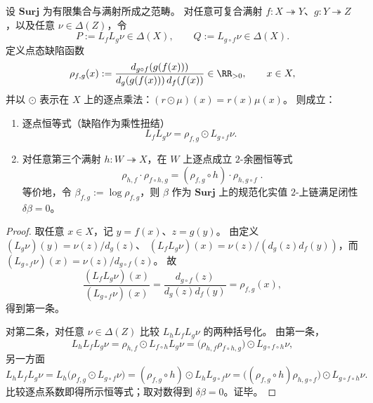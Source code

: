 \begin{theorem}\label{thm:pom-bc-defect-multiplicative-2cocycle}
设 \(\mathbf{Surj}\) 为有限集合与满射所成之范畴。
对任意可复合满射 \(f:X\twoheadrightarrow Y\)、\(g:Y\twoheadrightarrow Z\)，以及任意 \(\nu\in\Delta(Z)\)，令
\[
P:=L_fL_g\nu\in\Delta(X),\qquad Q:=L_{g\circ f}\nu\in\Delta(X).
\]
定义点态缺陷函数
\[
\rho_{f,g}(x):=\frac{d_{g\circ f}(g(f(x)))}{d_g(g(f(x)))\,d_f(f(x))}\in\RR_{>0},\qquad x\in X,
\]
并以 \(\odot\) 表示在 \(X\) 上的逐点乘法：\((r\odot\mu)(x)=r(x)\mu(x)\)。
则成立：
\begin{enumerate}
  \item 逐点恒等式（缺陷作为乘性扭结）
  \[
  \boxed{\;L_fL_g\nu=\rho_{f,g}\odot L_{g\circ f}\nu.\;}
  \]
  \item 对任意第三个满射 \(h:W\twoheadrightarrow X\)，在 \(W\) 上逐点成立 \(2\)-余圈恒等式
  \[
  \boxed{\;
  \rho_{h,f}\cdot \rho_{f\circ h,g}
  =(\rho_{f,g}\circ h)\cdot \rho_{h,g\circ f}\; }.
  \]
  等价地，令 \(\beta_{f,g}:=\log\rho_{f,g}\)，则 \(\beta\) 作为 \(\mathbf{Surj}\) 上的规范化实值 \(2\)-上链满足闭性 \(\delta\beta=0\)。
\end{enumerate}
\end{theorem}
\begin{proof}
取任意 \(x\in X\)，记 \(y=f(x)\)、\(z=g(y)\)。
由定义
\(
(L_g\nu)(y)=\nu(z)/d_g(z)
\)、
\(
(L_fL_g\nu)(x)=\nu(z)/(d_g(z)d_f(y))
\)，而
\(
(L_{g\circ f}\nu)(x)=\nu(z)/d_{g\circ f}(z)
\)。
故
\[
\frac{(L_fL_g\nu)(x)}{(L_{g\circ f}\nu)(x)}
=\frac{d_{g\circ f}(z)}{d_g(z)d_f(y)}
=\rho_{f,g}(x),
\]
得到第一条。
\par
对第二条，对任意 \(\nu\in\Delta(Z)\) 比较 \(L_hL_fL_g\nu\) 的两种括号化。
由第一条，
\[
L_hL_fL_g\nu
=\rho_{h,f}\odot L_{f\circ h}L_g\nu
=\bigl(\rho_{h,f}\rho_{f\circ h,g}\bigr)\odot L_{g\circ f\circ h}\nu,
\]
另一方面
\[
L_hL_fL_g\nu
=L_h\bigl(\rho_{f,g}\odot L_{g\circ f}\nu\bigr)
=(\rho_{f,g}\circ h)\odot L_hL_{g\circ f}\nu
=\bigl((\rho_{f,g}\circ h)\rho_{h,g\circ f}\bigr)\odot L_{g\circ f\circ h}\nu.
\]
比较逐点系数即得所示恒等式；取对数得到 \(\delta\beta=0\)。证毕。
\end{proof}

